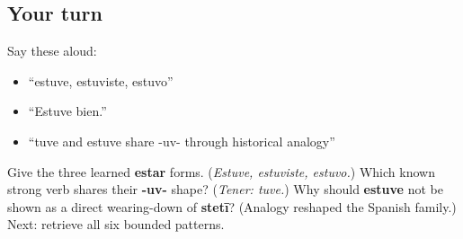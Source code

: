 \subsection*{Your turn}
Say these aloud:

\begin{itemize}
\raggedright
  \item “estuve, estuviste, estuvo”
  \item “Estuve bien.”
  \item “tuve and estuve share -uv- through historical analogy”
\end{itemize}

\begin{tcolorbox}[breakable,colback=teal!4,colframe=teal!35!black,title={Before you move on}]
Give the three learned \textbf{estar} forms. (\emph{Estuve, estuviste, estuvo.}) Which known strong verb shares their \textbf{-uv-} shape? (\emph{Tener: tuve.}) Why should \textbf{estuve} not be shown as a direct wearing-down of \textbf{stetī}? (Analogy reshaped the Spanish family.) Next: retrieve all six bounded patterns.
\end{tcolorbox}
